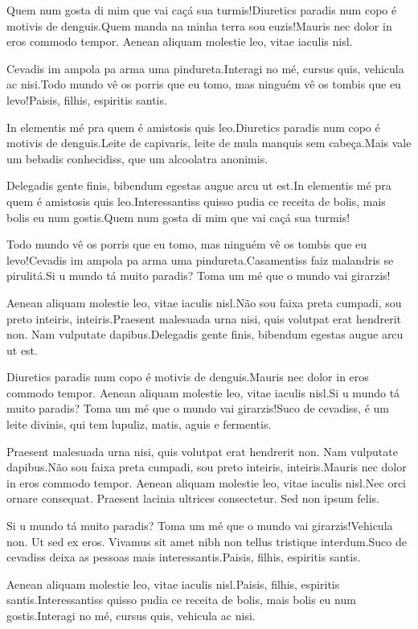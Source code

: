 \documentclass[english]{cenarticle}
\begin{document}
  Quem num gosta di mim que vai caçá sua turmis!Diuretics paradis num copo é motivis de denguis.Quem manda na minha terra sou euzis!Mauris nec dolor in eros commodo tempor. Aenean aliquam molestie leo, vitae iaculis nisl.
  
  Cevadis im ampola pa arma uma pindureta.Interagi no mé, cursus quis, vehicula ac nisi.Todo mundo vê os porris que eu tomo, mas ninguém vê os tombis que eu levo!Paisis, filhis, espiritis santis.
  
  In elementis mé pra quem é amistosis quis leo.Diuretics paradis num copo é motivis de denguis.Leite de capivaris, leite de mula manquis sem cabeça.Mais vale um bebadis conhecidiss, que um alcoolatra anonimis.
  
  Delegadis gente finis, bibendum egestas augue arcu ut est.In elementis mé pra quem é amistosis quis leo.Interessantiss quisso pudia ce receita de bolis, mais bolis eu num gostis.Quem num gosta di mim que vai caçá sua turmis!
  
  Todo mundo vê os porris que eu tomo, mas ninguém vê os tombis que eu levo!Cevadis im ampola pa arma uma pindureta.Casamentiss faiz malandris se pirulitá.Si u mundo tá muito paradis? Toma um mé que o mundo vai girarzis!
  
  Aenean aliquam molestie leo, vitae iaculis nisl.Não sou faixa preta cumpadi, sou preto inteiris, inteiris.Praesent malesuada urna nisi, quis volutpat erat hendrerit non. Nam vulputate dapibus.Delegadis gente finis, bibendum egestas augue arcu ut est.
  
  Diuretics paradis num copo é motivis de denguis.Mauris nec dolor in eros commodo tempor. Aenean aliquam molestie leo, vitae iaculis nisl.Si u mundo tá muito paradis? Toma um mé que o mundo vai girarzis!Suco de cevadiss, é um leite divinis, qui tem lupuliz, matis, aguis e fermentis.
  
  Praesent malesuada urna nisi, quis volutpat erat hendrerit non. Nam vulputate dapibus.Não sou faixa preta cumpadi, sou preto inteiris, inteiris.Mauris nec dolor in eros commodo tempor. Aenean aliquam molestie leo, vitae iaculis nisl.Nec orci ornare consequat. Praesent lacinia ultrices consectetur. Sed non ipsum felis.
  
  Si u mundo tá muito paradis? Toma um mé que o mundo vai girarzis!Vehicula non. Ut sed ex eros. Vivamus sit amet nibh non tellus tristique interdum.Suco de cevadiss deixa as pessoas mais interessantis.Paisis, filhis, espiritis santis.
  
  Aenean aliquam molestie leo, vitae iaculis nisl.Paisis, filhis, espiritis santis.Interessantiss quisso pudia ce receita de bolis, mais bolis eu num gostis.Interagi no mé, cursus quis, vehicula ac nisi.
  
\end{document}
